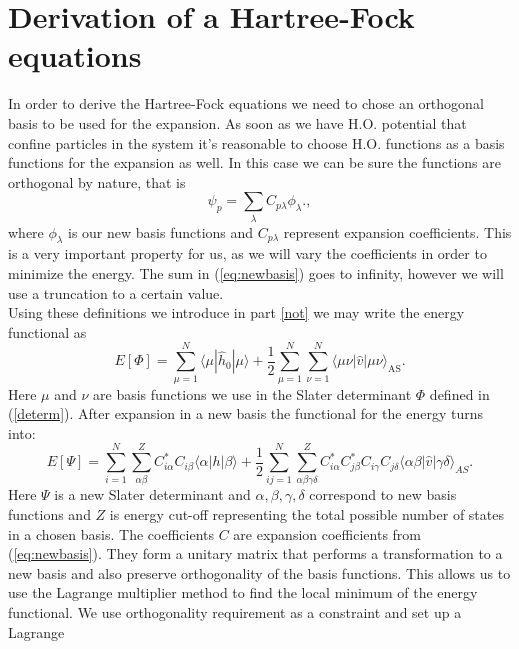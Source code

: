 \section{Derivation of a Hartree-Fock equations}
In order to derive the Hartree-Fock equations we need to chose an
orthogonal basis to be used for the expansion. As soon as we have
H.O. potential that confine particles in the system it's reasonable to
choose H.O. functions as a basis functions for the expansion as
well. In this case we can be sure the functions are orthogonal by
nature, that is
\begin{equation}
\psi_p  = \sum_{\lambda} C_{p\lambda}\phi_{\lambda}. \label{eq:newbasis}, 
\end{equation}
where $\phi_{\lambda}$ is our new basis functions and $C_{p\lambda}$ represent expansion coefficients. This is a very important property for us, as we will vary the coefficients in order to minimize the energy. The sum in (\ref{eq:newbasis}) goes to infinity, however we will use a truncation to a certain value. \\
Using these definitions we introduce in part \ref{not} we may write the energy functional as
\begin{equation}
E[\Phi] 
= \sum_{\mu=1}^N \langle \mu | \hat{h}_0 | \mu \rangle +
\frac{1}{2}\sum_{{\mu}=1}^N\sum_{{\nu}=1}^N \langle \mu\nu|\hat{v}|\mu\nu\rangle_{\mathrm{AS}}.
\label{FunctionalEPhi}
\end{equation}
Here $\mu$ and $\nu$ are basis functions we use in the Slater determinant $\Phi$ defined in (\ref{determ}). After expansion in a new basis the functional for the energy turns into:
\begin{equation}
E[\Psi] 
= \sum_{i=1}^N \sum_{\alpha\beta}^Z C^*_{i\alpha}C_{i\beta}\langle \alpha | h | \beta \rangle +
\frac{1}{2}\sum_{ij=1}^N\sum_{{\alpha\beta\gamma\delta}}^Z C^*_{i\alpha}C^*_{j\beta}C_{i\gamma}C_{j\delta}\langle \alpha\beta|\hat{v}|\gamma\delta\rangle_{AS}. \label{FunctionalEPhi3}
\end{equation}
Here $\Psi$ is a new Slater determinant and
$\alpha,\beta,\gamma,\delta$ correspond to new basis functions and $Z$
is energy cut-off representing the total possible number of states in
a chosen basis. The coefficients $C$ are expansion coefficients from
(\ref{eq:newbasis}). They form a unitary matrix that performs a
transformation to a new basis and also preserve orthogonality of the
basis functions. This allows us to use the Lagrange multiplier method
to find the local minimum of the energy functional. We use
orthogonality requirement as a constraint and set up a Lagrange
